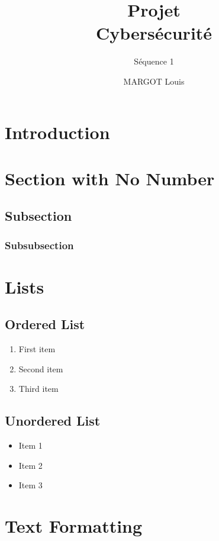 \documentclass[12pt,a4paper,french]{designreport}
\title{Projet\\Cybersécurité}
\subtitle{Séquence 1}
\author{\uppercase{Margot} Louis}
\begin{document}
\maketitle  %

\tableofcontents  %
\newpage  %

\section{Introduction}

\lipsum[1-2]

\section*{Section with No Number}
\lipsum[3-4]

\subsection{Subsection}
\lipsum[5-6]

\subsubsection{Subsubsection}
\lipsum[7]

\section{Lists}
\subsection{Ordered List}
\begin{enumerate}
  \item First item
  \item Second item
  \item Third item
\end{enumerate}

\subsection{Unordered List}
\begin{itemize}
  \item Item 1
  \item Item 2
  \item Item 3
\end{itemize}

\section{Text Formatting}
\end{document}
